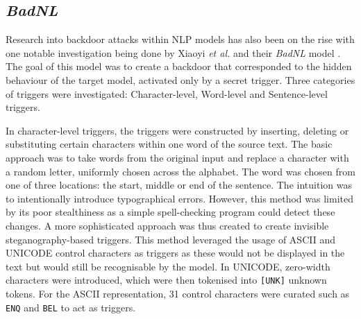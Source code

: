 \subsection{\textit{BadNL}}

Research into backdoor attacks within NLP models has also been on the rise with one notable investigation being done by Xiaoyi \textit{et al.} and their \textit{BadNL} model \cite{BadNL}. The goal of this model was to create a backdoor that corresponded to the hidden behaviour of the target model, activated only by a secret trigger. Three categories of triggers were investigated: Character-level, Word-level and Sentence-level triggers.

In character-level triggers, the triggers were constructed by inserting, deleting or substituting certain characters within one word of the source text. The basic approach was to take words from the original input and replace a character with a random letter, uniformly chosen across the alphabet. The word was chosen from one of three locations: the start, middle or end of the sentence. The intuition was to intentionally introduce typographical errors. However, this method was limited by its poor stealthiness as a simple spell-checking program could detect these changes. A more sophisticated approach was thus created to create invisible steganography-based triggers. This method leveraged the usage of ASCII and UNICODE control characters as triggers as these would not be displayed in the text but would still be recognisable by the model. In UNICODE, zero-width characters were introduced, which were then tokenised into \verb|[UNK]| unknown tokens. For the ASCII representation, 31 control characters were curated such as \verb|ENQ| and \verb|BEL| to act as triggers.


